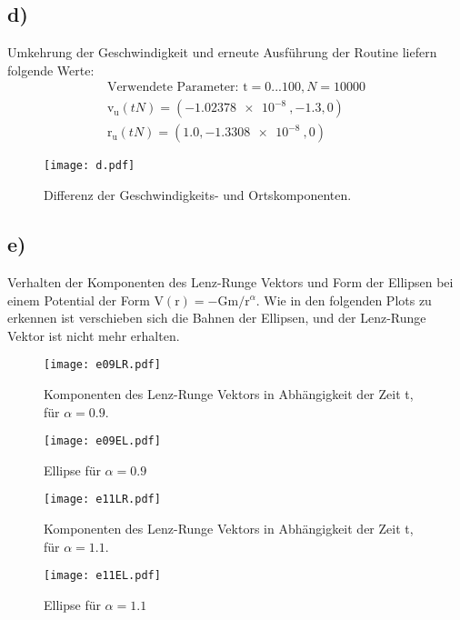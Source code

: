\documentclass[paper=a4, ngerman]{scrartcl}
\begin{document}
\FloatBarrier
\subsection{d)}
Umkehrung der Geschwindigkeit und erneute Ausführung der Routine liefern folgende Werte:
\begin{align}
	\nonumber \text{Verwendete Parameter:  } \mathrm{t}= 0...100, N=10000\\
    \nonumber \mathrm{v}_\mathrm{u}(tN)=(\SI{-1.02378e-8}{}, -1.3, 0) \\
    \nonumber \mathrm{r}_\mathrm{u}(tN)=(1.0, \SI{-1.3308e-8}{}, 0) 
\end{align}
\begin{figure}[htbp]
	\centering
	\texttt{[image: d.pdf]}
	\caption{Differenz der Geschwindigkeits- und Ortskomponenten.}
	\label{fig:d}
\end{figure}

\FloatBarrier
\subsection{e)}
Verhalten der Komponenten des Lenz-Runge Vektors und Form der Ellipsen bei einem Potential der Form $\mathrm{V(r)}=-\mathrm{Gm}/\mathrm{r}^{\alpha}$.
Wie in den folgenden Plots zu erkennen ist verschieben sich die Bahnen der Ellipsen, und der Lenz-Runge Vektor ist nicht mehr erhalten.
\begin{figure}[htbp]
	\centering
	\texttt{[image: e09LR.pdf]}
	\caption{Komponenten des Lenz-Runge Vektors in Abhängigkeit der Zeit t, für $\alpha=0.9$.}
	\label{fig:e09l}
\end{figure}
\begin{figure}[htbp]
	\centering
	\texttt{[image: e09EL.pdf]}
	\caption{Ellipse für $\alpha=0.9$}
	\label{fig:label1}
\end{figure}
\begin{figure}[htbp]
	\centering
	\texttt{[image: e11LR.pdf]}
	\caption{Komponenten des Lenz-Runge Vektors in Abhängigkeit der Zeit t, für $\alpha=1.1$.}
	\label{fig:e1LR}
\end{figure}
\begin{figure}[htbp]
	\centering
	\texttt{[image: e11EL.pdf]}
	\caption{Ellipse für $\alpha=1.1$}
	\label{fig:label2}
\end{figure}
\end{document}

